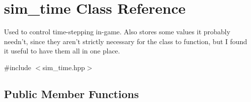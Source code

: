 \hypertarget{classsim__time}{\section{sim\-\_\-time Class Reference}
\label{classsim__time}
}


Used to control time-\/stepping in-\/game. Also stores some values it probably needn't, since they aren't strictly necessary for the class to function, but I found it useful to have them all in one place.  




{\ttfamily \#include $<$sim\-\_\-time.\-hpp$>$}

\subsection*{Public Member Functions}
